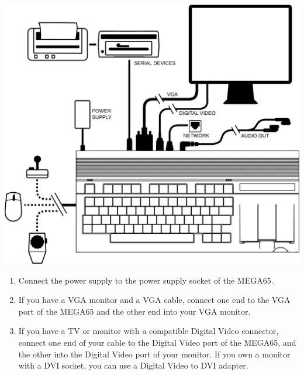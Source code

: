\includegraphics[width=\linewidth]{images/illustrations/mega65-top.pdf}


\begin{enumerate}
	\item Connect the power supply to the power supply socket of the MEGA65.
	\item If you have a VGA monitor and a VGA cable, connect one end to the VGA port of the MEGA65 and the other end into your VGA monitor.
	\item If you have a TV or monitor with a compatible Digital Video connector, connect one end of your cable to the Digital Video port of the MEGA65, and the other into the Digital Video port of your monitor. If you own a monitor with a DVI socket, you can use a Digital Video to DVI adapter.
\end{enumerate}

\newpage
